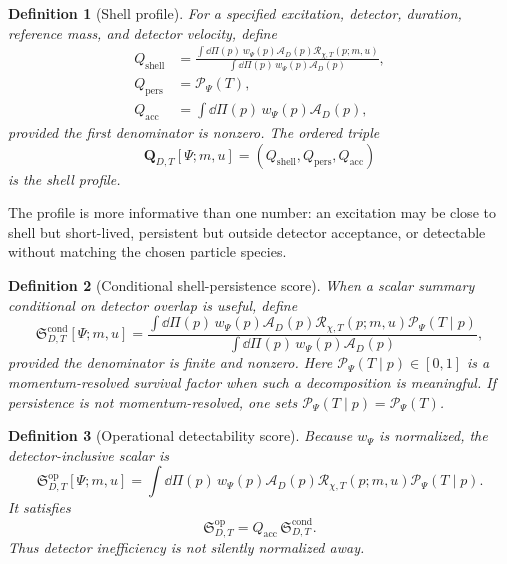 \documentclass[11pt]{article}
\newtheorem{definition}{Definition}
\theoremstyle{remark}
\newcommand{\Sop}{\mathfrak S}
\newcommand{\ShellRes}{\mathcal R}
\newcommand{\Persist}{\mathcal P}
\newcommand{\Access}{\mathcal A}
\begin{document}
\begin{definition}[Shell profile]
For a specified excitation, detector, duration, reference mass, and detector velocity, define
\begin{align}
  Q_{\mathrm{shell}}
  &=\frac{\int \dd\Pi(p)\,w_\Psi(p)\Access_D(p)
  \ShellRes_{\chi,T}(p;m,u)}
  {\int \dd\Pi(p)\,w_\Psi(p)\Access_D(p)},
  \\
  Q_{\mathrm{pers}}
  &=\Persist_\Psi(T),
  \\
  Q_{\mathrm{acc}}
  &=\int \dd\Pi(p)\,w_\Psi(p)\Access_D(p),
\end{align}
provided the first denominator is nonzero. The ordered triple
\begin{equation}
  \mathbf Q_{D,T}[\Psi;m,u]
  =\left(Q_{\mathrm{shell}},Q_{\mathrm{pers}},Q_{\mathrm{acc}}\right)
  \label{eq:shell-profile}
\end{equation}
is the \emph{shell profile}.
\end{definition}

The profile is more informative than one number: an excitation may be close to shell but short-lived, persistent but outside detector acceptance, or detectable without matching the chosen particle species.

\begin{definition}[Conditional shell-persistence score]
When a scalar summary conditional on detector overlap is useful, define
\begin{equation}
  \Sop^{\mathrm{cond}}_{D,T}[\Psi;m,u]
  =\frac{
  \int \dd\Pi(p)\,w_\Psi(p)\Access_D(p)
  \ShellRes_{\chi,T}(p;m,u)
  \Persist_\Psi(T\mid p)
  }{
  \int \dd\Pi(p)\,w_\Psi(p)\Access_D(p)
  },
  \label{eq:conditional-shellness}
\end{equation}
provided the denominator is finite and nonzero. Here
$\Persist_\Psi(T\mid p)\in[0,1]$ is a momentum-resolved survival factor when such a decomposition is meaningful. If persistence is not momentum-resolved, one sets
$\Persist_\Psi(T\mid p)=\Persist_\Psi(T)$.
\end{definition}

\begin{definition}[Operational detectability score]
Because $w_\Psi$ is normalized, the detector-inclusive scalar is
\begin{equation}
  \Sop^{\mathrm{op}}_{D,T}[\Psi;m,u]
  =
  \int \dd\Pi(p)\,w_\Psi(p)\Access_D(p)
  \ShellRes_{\chi,T}(p;m,u)
  \Persist_\Psi(T\mid p).
  \label{eq:operational-shellness}
\end{equation}
It satisfies
\begin{equation}
  \Sop^{\mathrm{op}}_{D,T}
  =Q_{\mathrm{acc}}\,
  \Sop^{\mathrm{cond}}_{D,T}.
  \label{eq:op-cond-relation}
\end{equation}
Thus detector inefficiency is not silently normalized away.
\end{definition}
\end{document}
